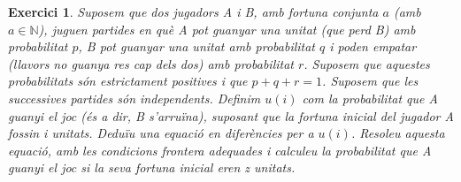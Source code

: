 \documentclass[10pt,a4paper]{article}
\newcommand{\NN}{\ensuremath{\mathbb{N}}} %
\newtheorem{exercici}{Exercici}
\theoremstyle{definition}
\theoremstyle{remark}
\begin{document}
\begin{exercici}
  Suposem que dos jugadors A i B, amb fortuna conjunta $a$ (amb $a \in \NN$), juguen partides en què A pot guanyar una unitat (que perd B) amb probabilitat $p$, B pot guanyar una unitat amb probabilitat $q$ i poden empatar (llavors no guanya res cap dels dos) amb probabilitat $r$. Suposem que aquestes probabilitats són estrictament positives i que $p + q + r = 1$. Suposem que les successives partides són independents. Definim $u(i)$ com la probabilitat que A guanyi el joc (és a dir, B s'arruïna), suposant que la fortuna inicial del jugador A fossin i unitats. Deduïu una equació en diferències per a $u(i)$.
  Resoleu aquesta equació, amb les condicions frontera adequades i calculeu la probabilitat que A guanyi el joc si la seva fortuna inicial eren z unitats.
\end{exercici}
\end{document}
